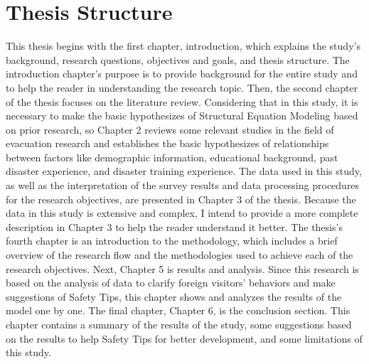 \section{Thesis Structure}
This thesis begins with the first chapter, introduction, which explains the study's background, research questions, objectives and goals, and thesis structure. The introduction chapter's purpose is to provide background for the entire study and to help the reader in understanding the research topic. Then, the second chapter of the thesis focuses on the literature review. Considering that in this study, it is necessary to make the basic hypothesizes of Structural Equation Modeling based on prior research, so Chapter 2 reviews some relevant studies in the field of evacuation research and establishes the basic hypothesizes of relationships between factors like demographic information, educational background, past disaster experience, and disaster training experience. The data used in this study, as well as the interpretation of the survey results and data processing procedures for the research objectives, are presented in Chapter 3 of the thesis. Because the data in this study is extensive and complex, I intend to provide a more complete description in Chapter 3 to help the reader understand it better. The thesis's fourth chapter is an introduction to the methodology, which includes a brief overview of the research flow and the methodologies used to achieve each of the research objectives. Next, Chapter 5 is results and analysis. Since this research is based on the analysis of data to clarify foreign visitors' behaviors and make suggestions of Safety Tips, this chapter shows and analyzes the results of the model one by one. The final chapter, Chapter 6, is the conclusion section. This chapter contains a summary of the results of the study, some suggestions based on the results to help Safety Tips for better development, and some limitations of this study.

